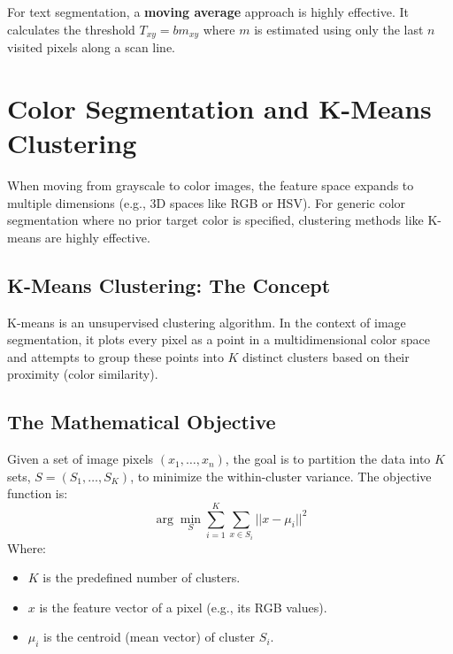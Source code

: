 \documentclass{report}
\begin{document}
For text segmentation, a \textbf{moving average} approach is highly effective. It calculates the threshold $T_{xy} = b m_{xy}$ where $m$ is estimated using only the last $n$ visited pixels along a scan line.


\chapter{Color Segmentation and K-Means Clustering}

When moving from grayscale to color images, the feature space expands to multiple dimensions (e.g., 3D spaces like RGB or HSV). For generic color segmentation where no prior target color is specified, clustering methods like K-means are highly effective.

\section{K-Means Clustering: The Concept}
K-means is an unsupervised clustering algorithm. In the context of image segmentation, it plots every pixel as a point in a multidimensional color space and attempts to group these points into $K$ distinct clusters based on their proximity (color similarity).

\section{The Mathematical Objective}
Given a set of image pixels $(x_1, \dots, x_n)$, the goal is to partition the data into $K$ sets, $S = (S_1, \dots, S_K)$, to minimize the within-cluster variance. The objective function is:
\begin{equation}
    \arg\min_{S} \sum_{i=1}^{K} \sum_{x \in S_i} ||x - \mu_i||^2
\end{equation}
Where:
\begin{itemize}
    \item $K$ is the predefined number of clusters.
    \item $x$ is the feature vector of a pixel (e.g., its RGB values).
    \item $\mu_i$ is the centroid (mean vector) of cluster $S_i$.
\end{itemize}
\end{document}

